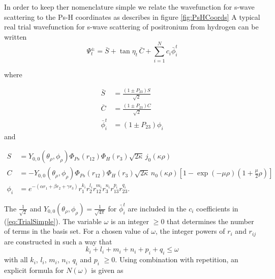 \documentclass[preprint,showpacs,preprintnumbers,amsmath,amssymb]{revtex4}
\newcommand{\beq}{\begin{equation}}
\newcommand{\eeq}{\end{equation}}
\begin{document}
In order to keep ther nomenclature simple we relate the wavefunction for s-wave scattering to the Ps-H coordinates as describes in figure \ref{fig:PsHCoords}
A typical real  trial wavefunction for s-wave  scattering of positronium from hydrogen can be written
\begin{equation}
\Psi_t^\pm = \bar{S} + \tan \eta_t \, \bar{C} + \sum_{i=1}^N c_i \bar{\phi}_i^t
\label{eq:TrialSimple}
\end{equation}

\noindent where

\begin{subequations}\label{SCphiBarDef}
\begin{align}
\bar{S} &= \frac{\left( 1 \pm P_{23} \right) S}{\sqrt{2}} \label{SBarDef} \\
\bar{C} &= \frac{\left( 1 \pm P_{23} \right) C}{\sqrt{2}} \label{CBarDef} \\
\bar{\phi}_i^t &= \left( 1 \pm P_{23} \right) \phi_i \label{PhiBarDef}
\end{align}
\end{subequations}
\noindent and

\begin{subequations}\label{eq:SCPhiDef}
\begin{align}
S &= Y_{0,0}\left( \theta_\rho, \phi_\rho \right) \Phi_{Ps}\left(r_{12}\right) \Phi_H\left(r_3\right) \sqrt{2\kappa} \,j_0\!\left(\kappa\rho\right) \label{eq:SDef} \\
C &= -Y_{0,0}\left( \theta_\rho, \phi_\rho \right) \Phi_{Ps}\left(r_{12}\right) \Phi_H\left(r_3\right) \sqrt{2\kappa} \,n_0\!\left(\kappa\rho\right) \left[1 - \exp(-\mu \rho) (1+\frac{\mu}{2}\rho)\right] \label{eq:CDef} \\
\phi_i &= e^{-\left(\alpha r_1 + \beta r_2 + \gamma r_3 \right)} r_1^{k_i} r_2^{l_i} r_{12}^{m_i} r_3^{n_i} r_{13}^{p_i} r_{23}^{q_i}. \label{eq:PhiDef}
\end{align}
\end{subequations}

\noindent The $\frac{1}{\sqrt{2}}$ and $Y_{0,0}\left( \theta_\rho, \phi_\rho \right) = \frac{1}{\sqrt{4\pi}}$ for $\bar{\phi}_i^t$ are included in the $c_i$ coefficients in (\ref{eq:TrialSimple}).
The variable $\omega$ is an integer $\geq 0$ that determines the number of terms in the basis set.  For a chosen value of $\omega$, the integer powers of $r_i$ and $r_{ij}$ are constructed in such a way that
\beq
k_i + l_i + m_i + n_i + p_i + q_i \leq \omega
\eeq
\noindent with all $k_i$, $l_i$, $m_i$, $n_i$, $q_i$ and $p_i$ $\geq 0$.  Using combination with repetition, an explicit formula for $N(\omega)$ is given as
\end{document}
